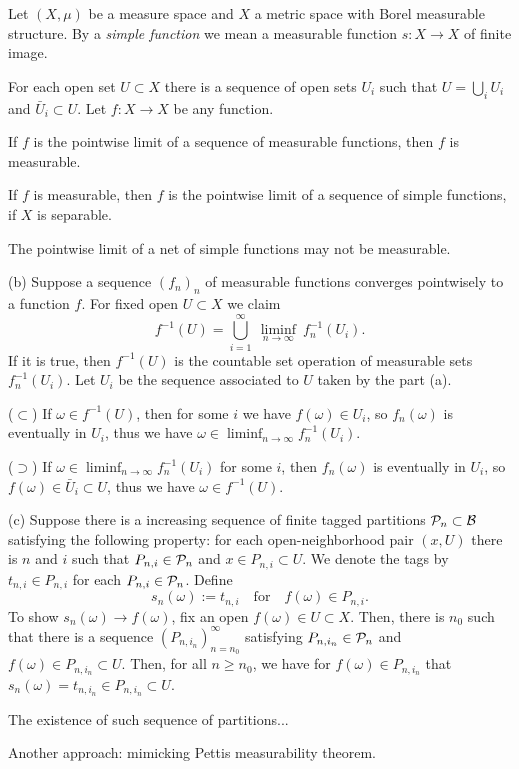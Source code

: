 \documentclass{../../large}
\begin{document}
\begin{prb}
Let $(X,\mu)$ be a measure space and $X$ a metric space with Borel measurable structure.
By a \emph{simple function} we mean a measurable function $s:X\to X$ of finite image.
\begin{parts}
\item For each open set $U\subset X$ there is a sequence of open sets $U_i$ such that $U=\bigcup_iU_i$ and $\bar U_i\subset U$.
Let $f:X\to X$ be any function.
\item If $f$ is the pointwise limit of a sequence of measurable functions, then $f$ is measurable.
\item If $f$ is measurable, then $f$ is the pointwise limit of a sequence of simple functions, if $X$ is separable.
\item* The pointwise limit of a net of simple functions may not be measurable.
\end{parts}
\end{prb}
\begin{pf}

(b)
Suppose a sequence $(f_n)_n$ of measurable functions converges pointwisely to a function $f$.
For fixed open $U\subset X$ we claim
\[f^{-1}(U)=\bigcup_{i=1}^\infty\ \liminf_{n\to\infty}\ f_n^{-1}(U_i).\]
If it is true, then $f^{-1}(U)$ is the countable set operation of measurable sets $f_n^{-1}(U_i)$.
Let $U_i$ be the sequence associated to $U$ taken by the part (a).

($\subset$) If $\omega\in f^{-1}(U)$, then for some $i$ we have $f(\omega)\in U_i$, so $f_n(\omega)$ is eventually in $U_i$, thus we have $\omega\in\liminf_{n\to\infty}f_n^{-1}(U_i)$.

($\supset$) If $\omega\in\liminf_{n\to\infty}f_n^{-1}(U_i)$ for some $i$, then $f_n(\omega)$ is eventually in $U_i$, so $f(\omega)\in\bar U_i\subset U$, thus we have $\omega\in f^{-1}(U)$.

(c)
Suppose there is a increasing sequence of finite tagged partitions $\mathcal{P}_n\subset\mathcal{B}$ satisfying the following property: for each open-neighborhood pair $(x,U)$ there is $n$ and $i$ such that $P_{n,i}\in\mathcal{P}_n$ and $x\in P_{n,i}\subset U$.
We denote the tags by $t_{n,i}\in P_{n,i}$ for each $P_{n,i}\in\mathcal{P}_n$.
Define
\[s_n(\omega):=t_{n,i}\quad\text{for}\quad f(\omega)\in P_{n,i}.\]
To show $s_n(\omega)\to f(\omega)$, fix an open $f(\omega)\in U\subset X$.
Then, there is $n_0$ such that there is a sequence $(P_{n,i_n})_{n=n_0}^\infty$ satisfying $P_{n,i_n}\in\mathcal{P}_n$ and $f(\omega)\in P_{n,i_n}\subset U$.
Then, for all $n\ge n_0$, we have for $f(\omega)\in P_{n,i_n}$ that $s_n(\omega)=t_{n,i_n}\in P_{n,i_n}\subset U$.

The existence of such sequence of partitions...

Another approach: mimicking Pettis measurability theorem.
\end{pf}
\end{document}
